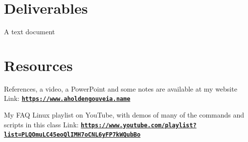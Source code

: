 \documentclass[12pt]{article}
\begin{document}
\section*{Deliverables}
A text document


\section*{Resources}
References, a video, a PowerPoint and some notes are available at my website
Link: \href{https://www.aholdengouveia.name}{\textbf{\nolinkurl{https://www.aholdengouveia.name}}}

My FAQ Linux playlist on YouTube, with demos of many of the commands and scripts in this class
Link: \href{https://www.youtube.com/playlist?list=PLQOmuLC45eoQlIMH7oCNL6yFP7kWQubBo}{\textbf{\nolinkurl{https://www.youtube.com/playlist?list=PLQOmuLC45eoQlIMH7oCNL6yFP7kWQubBo}}}
\end{document}
